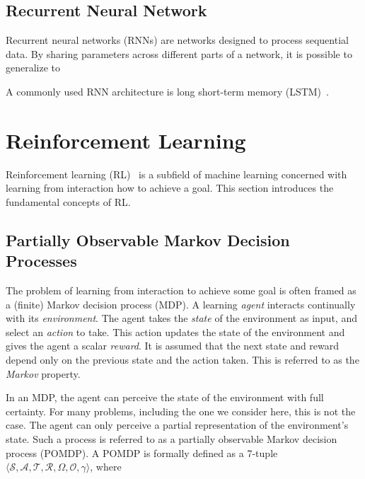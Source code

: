 \subsection{Recurrent Neural Network}

Recurrent neural networks (RNNs) are networks designed to process sequential data.
By sharing parameters across different parts of a network, it is possible to generalize to 

A commonly used RNN architecture is long short-term memory (LSTM)~\cite{hochreiter_schmidhuber_lstm_1997}.

\section{Reinforcement Learning}

Reinforcement learning (RL)~\cite{sutton_reinforcement_2018} is a subfield of machine learning concerned with learning from interaction how to achieve a goal.
This section introduces the fundamental concepts of RL.

\subsection{Partially Observable Markov Decision Processes}

The problem of learning from interaction to achieve some goal is often framed as a (finite) Markov decision process (MDP).
A learning \textit{agent} interacts continually with its \textit{environment}.
The agent takes the \textit{state} of the environment as input, and select an \textit{action} to take.
This action updates the state of the environment and gives the agent a scalar \textit{reward}.
It is assumed that the next state and reward depend only on the previous state and the action taken.
This is referred to as the \textit{Markov} property.~\cite{kaelbling_pomdp_1998}

In an MDP, the agent can perceive the state of the environment with full certainty.
For many problems, including the one we consider here, this is not the case.
The agent can only perceive a partial representation of the environment's state.
Such a process is referred to as a partially observable Markov decision process (POMDP).
A POMDP is formally defined as a 7-tuple \(\langle \mathcal{S}, \mathcal{A}, \mathcal{T}, \mathcal{R}, \Omega, \mathcal{O}, \gamma \rangle\), where

